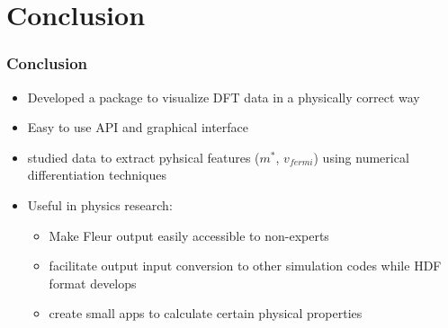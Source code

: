 
\section{Conclusion} 

\begin{frame}
\frametitle{Conclusion}
\begin{itemize}
     \item<1-> Developed a package to visualize DFT data in a physically correct way
     \item<2-> Easy to use API and graphical interface
     \item<3-> studied data to extract pyhsical features ($m^*$, $v_{fermi}$) using
         numerical differentiation techniques
     \item<4-> Useful in physics research:
     \begin{itemize}
         \item<5-> Make Fleur output easily accessible to non-experts
         \item<6-> facilitate output \faArrowRight{} input conversion to other
             simulation codes while HDF format develops
         \item<8-> create small apps to calculate certain physical properties 
     \end{itemize}
\end{itemize}
\end{frame}
